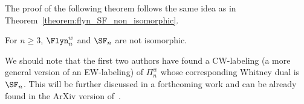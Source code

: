 The proof of the following theorem follows the same  idea as in Theorem~\ref{theorem:flyn_SF_non_isomorphic}.
\begin{theo}
 For $n\geq 3$, $\Flyn_{n}^{w}$ and $\SF_n$ are not isomorphic. 
\end{theo}

 \begin{rema}
 We should note that the first two authors have found a CW-labeling (a more general version of an EW-labeling) of $\Pi_n^w$ whose corresponding Whitney dual is $\SF_n$. This will be further discussed in a forthcoming work and can be already found in the ArXiv version of~\cite{GonzalezHallam2021}. 
 \end{rema}
